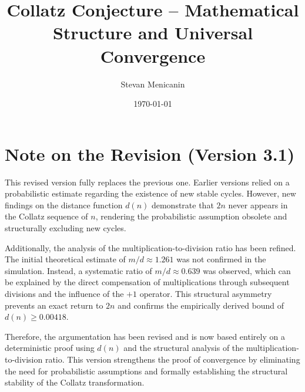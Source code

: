 \documentclass[a4paper,12pt]{article}
\title{Collatz Conjecture – Mathematical Structure and Universal Convergence}
\author{Stevan Menicanin}
\date{\today}
\begin{document}
\maketitle

\section*{Note on the Revision (Version 3.1)}
This revised version fully replaces the previous one. Earlier versions relied on a probabilistic estimate regarding the existence of new stable cycles. However, new findings on the distance function $d(n)$ demonstrate that $2n$ never appears in the Collatz sequence of $n$, rendering the probabilistic assumption obsolete and structurally excluding new cycles.

Additionally, the analysis of the multiplication-to-division ratio has been refined. The initial theoretical estimate of $m/d \approx 1.261$ was not confirmed in the simulation. Instead, a systematic ratio of $m/d \approx 0.639$ was observed, which can be explained by the direct compensation of multiplications through subsequent divisions and the influence of the $+1$ operator. This structural asymmetry prevents an exact return to $2n$ and confirms the empirically derived bound of $d(n) \geq 0.00418$.

Therefore, the argumentation has been revised and is now based entirely on a deterministic proof using $d(n)$ and the structural analysis of the multiplication-to-division ratio. This version strengthens the proof of convergence by eliminating the need for probabilistic assumptions and formally establishing the structural stability of the Collatz transformation.
\end{document}
